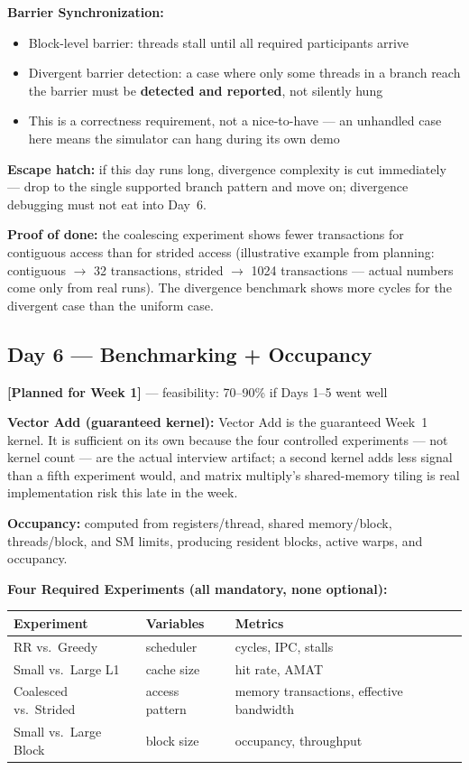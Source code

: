 \documentclass[11pt]{article}
\newcommand{\statuslabel}[1]{\textbf{\textcolor{steel}{[#1]}}}
\begin{document}
\textbf{Barrier Synchronization:}
\begin{itemize}[leftmargin=1.2cm]
  \item Block-level barrier: threads stall until all required participants
  arrive
  \item Divergent barrier detection: a case where only some threads in a
  branch reach the barrier must be \textbf{detected and reported}, not
  silently hung
  \item This is a correctness requirement, not a nice-to-have --- an
  unhandled case here means the simulator can hang during its own demo
\end{itemize}

\textbf{Escape hatch:} if this day runs long, divergence complexity is cut
immediately --- drop to the single supported branch pattern and move on;
divergence debugging must not eat into Day~6.

\textbf{Proof of done:} the coalescing experiment shows fewer transactions
for contiguous access than for strided access (illustrative example from
planning: contiguous $\to$ 32 transactions, strided $\to$ 1024
transactions --- actual numbers come only from real runs). The divergence
benchmark shows more cycles for the divergent case than the uniform case.

\subsection{Day 6 --- Benchmarking + Occupancy}
\statuslabel{Planned for Week 1} --- feasibility: 70--90\% if Days 1--5
went well

\textbf{Vector Add (guaranteed kernel):} Vector Add is the guaranteed
Week~1 kernel. It is sufficient on its own because the four controlled
experiments --- not kernel count --- are the actual interview artifact; a
second kernel adds less signal than a fifth experiment would, and matrix
multiply's shared-memory tiling is real implementation risk this late in
the week.

\textbf{Occupancy:} computed from registers/thread, shared memory/block,
threads/block, and SM limits, producing resident blocks, active warps, and
occupancy.

\textbf{Four Required Experiments (all mandatory, none optional):}

\begin{center}
\begin{tabularx}{\textwidth}{@{}p{3.6cm}p{3.6cm}X@{}}
\toprule
\textbf{Experiment} & \textbf{Variables} & \textbf{Metrics} \\
\midrule
RR vs.\ Greedy & scheduler & cycles, IPC, stalls \\
Small vs.\ Large L1 & cache size & hit rate, AMAT \\
Coalesced vs.\ Strided & access pattern & memory transactions, effective
bandwidth \\
Small vs.\ Large Block & block size & occupancy, throughput \\
\bottomrule
\end{tabularx}
\end{center}
\end{document}
